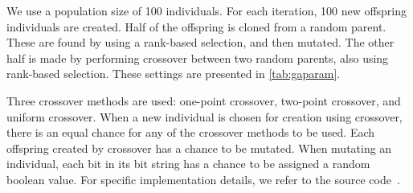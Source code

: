 We use a population size of \num{100} individuals. For each iteration, \num{100} new offspring individuals are created. Half of the offspring is cloned from a random parent. These are found by using a rank-based selection, and then mutated. The other half is made by performing crossover between two random parents, also using rank-based selection. These settings are presented in \cref{tab:gaparam}.

Three crossover methods are used: one-point crossover, two-point crossover, and uniform crossover. When a new individual is chosen for creation using crossover, there is an equal chance for any of the crossover methods to be used. Each offspring created by crossover has a  chance to be mutated. When mutating an individual, each bit in its bit string has a  chance to be assigned a random boolean value. For specific implementation details, we refer to the source code~\cite{mbm:kmc:ekoGA}.




